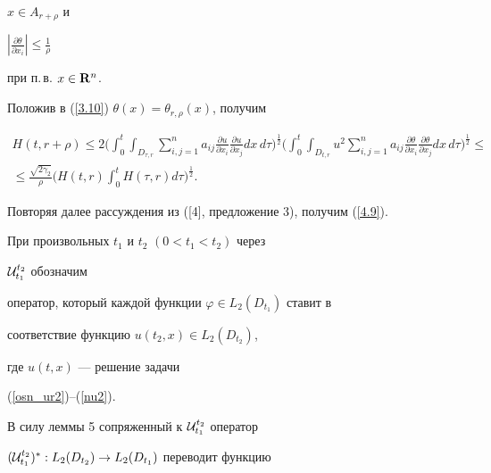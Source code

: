 \begin{pf}
$x\in {A}_{r+\rho}$ и


$|\frac{\partial \theta}{\partial x_i}|\leq \frac{1}{\rho}$


при п.\,в. $x \in {\bold R}^n$.





Положив в (\ref{3.10}) $\theta(x)=\theta_{r,\rho}(x)$, получим


\begin{multline*}




H(t,r+\rho)\leq 2\bigg( \int_0^t \int_{D_{\tau,r}}


\sum_{i,j=1}^n a_{ij}\frac{\partial u}{\partial x_i}


\frac{\partial u}{\partial x_j} dx\, d\tau \bigg)^{\frac{1}{2}}


\bigg( \int_0^t\int_{D_{t,r}} u^2


\sum_{i,j=1}^n a_{ij}\frac{\partial \theta}{\partial x_i}


\frac{\partial \theta}{\partial x_j}


dx\, d\tau \bigg)^{\frac{1}{2}}\leq \\


%


\leq \frac{\sqrt{2\gamma_2}}{\rho} \bigg(H(t,r)


\int_0^t H(\tau,r)d\tau \bigg)^{\frac{1}{2}}.


\end{multline*}


Повторяя далее рассуждения из ([4], предложение 3), получим (\ref{4.9}). 


\end{pf}





При произвольных $t_1$ и $t_2$ $(0<t_1<t_2)$ через 


${\cal U}_{t_1}^{t_2}$ обозначим


оператор, который каждой функции $\varphi \in L_2(D_{t_1})$ ставит в 


соответствие функцию $u(t_2,x)\in L_2(D_{t_2})$, 


где $u(t,x)$ --- решение задачи


(\ref{osn_ur2})--(\ref{nu2}).


В силу леммы 5 сопряженный к ${\cal U}_{t_1}^{t_2}$ оператор


$({\cal U}_{t_1}^{t_2})^* :L_2(D_{t_2})\to L_2(D_{t_1})$ переводит функцию


